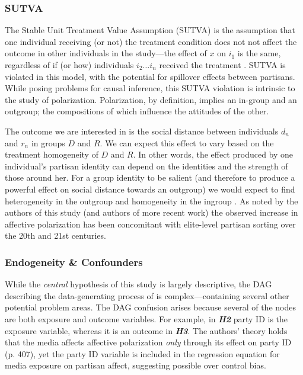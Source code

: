 \documentclass[12pt]{article}
\begin{document}
\subsubsection{SUTVA}
The Stable Unit Treatment Value Assumption (SUTVA) is the assumption that one individual receiving (or not) the treatment condition does not not affect the outcome in other individuals in the study---the effect of $x$ on $i_1$ is the same, regardless of if (or how) individuals $i_2 \ldots i_n$ received the treatment \citep[p. 48]{morgan2015counterfactuals}. 
SUTVA is violated in this model, with the potential for spillover effects between partisans. While posing problems for causal inference, this SUTVA violation is intrinsic to the study of polarization. Polarization, by definition, implies an in-group and an outgroup; the compositions of which influence the attitudes of the other. 

The outcome we are interested in is the social distance between individuals $d_n$ and $r_n$ in groups $D$ and $R$. We can expect this effect to vary based on the treatment homogeneity of $D$ and $R$. In other words, the effect produced by one individual’s partisan identity can depend on the identities and the strength of those around her. For a group identity to be salient (and therefore to produce a powerful effect on social distance towards an outgroup) we would expect to find heterogeneity in the outgroup and homogeneity in the ingroup \citep{rohde1991parties}. As noted by the authors of this study (and authors of more recent work) the observed increase in affective polarization has been concomitant with elite-level partisan sorting over the 20th and 21st centuries. 

\subsubsection{Endogeneity \& Confounders}


While the \textit{central} hypothesis of this study is largely descriptive, the DAG describing the data-generating process of \citeauthor{iyengar2012affect} is complex---containing several other potential problem areas. The DAG confusion arises because several of the nodes are both exposure and outcome variables. For example, in \textbf{\textit{H2}} party ID is the exposure variable, whereas it is an outcome in \textbf{\textit{H3}}. The authors' theory holds that the media affects affective polarization \textit{only} through its effect on party ID (p. 407), yet the party ID variable is included in the regression equation for media exposure on partisan affect, suggesting possible over control bias.
\end{document}
